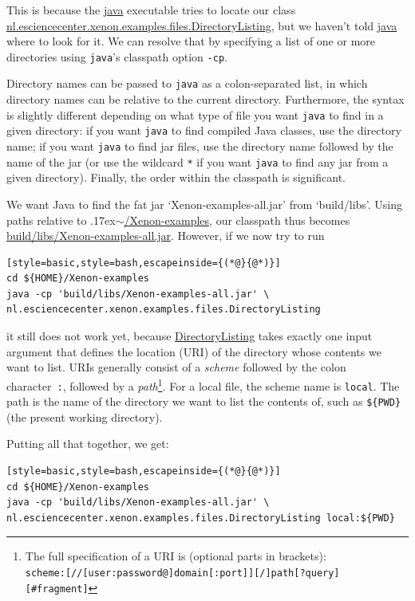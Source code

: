 \documentclass[12pt, a4paper, twoside, openany, titlepage]{book}
\newcommand{\mytilde}{\raise.17ex\hbox{$\scriptstyle\sim$}}
\begin{document}
This is because the \url{java} executable tries to locate our class \url{nl.esciencecenter.xenon.examples.files.DirectoryListing}, but we haven't told \url{java} where to look for it. We can resolve that by specifying a list of one or more directories using \texttt{java}'s classpath option \texttt{-cp}.

Directory names can be passed to \texttt{java} as a colon-separated list, in which directory names can be relative to the current directory. Furthermore, the syntax is slightly different depending on what type of file you want \texttt{java} to find in a given directory: if you want \texttt{java} to find compiled Java classes, use the directory name; if you want \texttt{java} to find jar files, use the directory name followed by the name of the jar (or use the wildcard \texttt{*} if you want \texttt{java} to find any jar from a given directory). Finally, the order within the classpath is significant.


We want Java to find the fat jar `Xenon-examples-all.jar' from `build/libs'. Using paths relative to \mytilde\url{/Xenon-examples}, our classpath thus becomes \url{build/libs/Xenon-examples-all.jar}. However, if we now try to run
\begin{lstlisting}[style=basic,style=bash,escapeinside={(*@}{@*)}]
cd ${HOME}/Xenon-examples
java -cp 'build/libs/Xenon-examples-all.jar' \
nl.esciencecenter.xenon.examples.files.DirectoryListing
\end{lstlisting}
it still does not work yet, because \url{DirectoryListing} takes exactly one input argument that defines the location (URI) of the directory whose contents we want to list. URIs generally consist of a \textit{scheme} followed by the colon character~\texttt{:}, followed by a \textit{path}\footnote{The full specification of a URI is (optional parts in brackets): \\ \texttt{scheme:[//[user:password@]domain[:port]][/]path[?query][#fragment]}\label{footnote:format-uri}}. For a local file, the scheme name is \texttt{local}. The path is the name of the directory we want to list the contents of, such as \texttt{\$\{PWD\}} (the present working directory).

Putting all that together, we get:

\begin{lstlisting}[style=basic,style=bash,escapeinside={(*@}{@*)}]
cd ${HOME}/Xenon-examples
java -cp 'build/libs/Xenon-examples-all.jar' \
nl.esciencecenter.xenon.examples.files.DirectoryListing local:${PWD}
\end{lstlisting} \label{snip:directory-listing-local}
\end{document}
